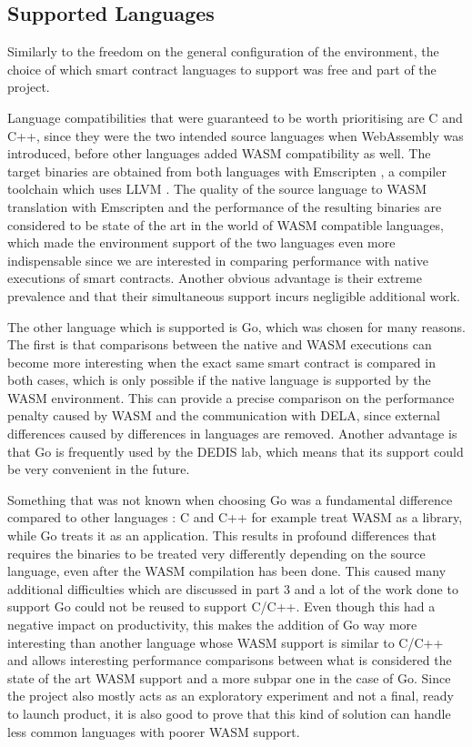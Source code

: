 \documentclass[11pt, a4paper, twoside, openright]{article}
\begin{document}
\subsection{Supported Languages}

Similarly to the freedom on the general configuration of the environment, the choice of which smart contract languages to support was free and part of the project.

Language compatibilities that were guaranteed to be worth prioritising are C and C++, since they were the two intended source languages when WebAssembly was introduced, before other languages added WASM compatibility as well. The target binaries are obtained from both languages with Emscripten \cite{emscripten}, a compiler toolchain which uses LLVM \cite{llvm}. The quality of the source language to WASM translation with Emscripten and the performance of the resulting binaries are considered to be state of the art in the world of WASM compatible languages, which made the environment support of the two languages even more indispensable since we are interested in comparing performance with native executions of smart contracts. Another obvious advantage is their extreme prevalence and that their simultaneous support incurs negligible additional work.

The other language which is supported is Go, which was chosen for many reasons. The first is that comparisons between the native and WASM executions can become more interesting when the exact same smart contract is compared in both cases, which is only possible if the native language is supported by the WASM environment. This can provide a precise comparison on the performance penalty caused by WASM and the communication with DELA, since external differences caused by differences in languages are removed. Another advantage is that Go is frequently used by the DEDIS lab, which means that its support could be very convenient in the future.

Something that was not known when choosing Go was a fundamental difference compared to other languages : C and C++ for example treat WASM as a library, while Go treats it as an application. This results in profound differences that requires the binaries to be treated very differently depending on the source language, even after the WASM compilation has been done. This caused many additional difficulties which are discussed in part 3 and a lot of the work done to support Go could not be reused to support C/C++. Even though this had a negative impact on productivity, this makes the addition of Go way more interesting than another language whose WASM support is similar to C/C++ and allows interesting performance comparisons between what is considered the state of the art WASM support and a more subpar one in the case of Go. Since the project also mostly acts as an exploratory experiment and not a final, ready to launch product, it is also good to prove that this kind of solution can handle less common languages with poorer WASM support.
\end{document}
